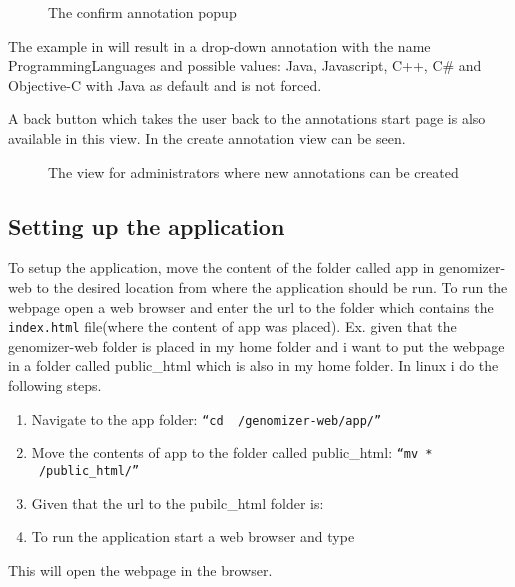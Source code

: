 \begin{figure}[h]
 \caption{The confirm annotation popup}
 \label{adm_web_createPopup}
\end{figure}

The example in  will result in a drop-down annotation with the name ProgrammingLanguages and possible values: Java, Javascript, C++, C\# and Objective-C  with Java as default and is not forced.

A back button which takes the user back to the annotations start page is also available in this view. In  the create annotation view can be seen.

\begin{figure}[t]
 \caption{The view for administrators where new annotations can be created}
 \label{adm_web_createView}
\end{figure}

\subsection{Setting up the application}
To setup the application, move the content of the folder called app in genomizer-web to the desired location from where the application should be run. To run the webpage open a web browser and enter the url to the folder which contains the \texttt{index.html} file(where the content of app was placed).
Ex. given that the genomizer-web folder is placed in my home folder and i want to put the webpage in a folder called public\_html which is also in my home folder. In linux i do the following steps.
\begin{enumerate}
	\item Navigate to the app folder: \texttt{“cd ~/genomizer-web/app/”}
	\item Move the contents of app to the folder called public\_html: \texttt{“mv * ~/public\_html/”}
	\item Given that the url to the pubilc\_html folder is: 
	\item To run the application start a web browser and type 
\end{enumerate}
This will open the webpage in the browser.



